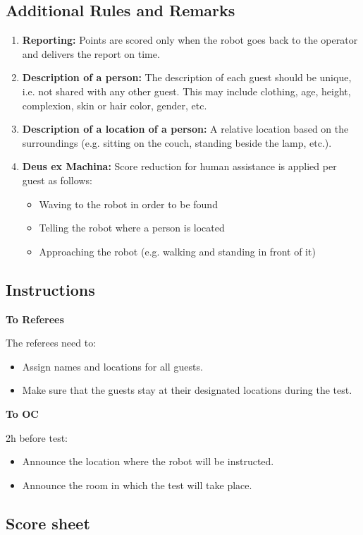 \subsection*{Additional Rules and Remarks}
\begin{enumerate}[nosep]
	\item \textbf{Reporting:} Points are scored only when the robot goes back to the operator and delivers the report on time.

    \item \textbf{Description of a person:} The description of each guest should be unique, i.e. not shared with any other guest. This may include clothing, age, height, complexion, skin or hair color, gender, etc.

	\item \textbf{Description of a location of a person:} A relative location based on the surroundings (e.g. sitting on the couch, standing beside the lamp, etc.).
	

	\item \textbf{Deus ex Machina:} Score reduction for human assistance is applied per guest as follows:

		\begin{itemize}
		    \item Waving to the robot in order to be found
			\item Telling the robot where a person is located
			\item Approaching the robot (e.g. walking and standing in front of it)
		\end{itemize}

\end{enumerate}

\subsection*{Instructions}

\textbf{To Referees}

The referees need to:
\begin{itemize}
	\item Assign names and locations for all guests.
	\item Make sure that the guests stay at their designated locations during the test.
\end{itemize}

\noindent \textbf{To OC}

2h before test:
\begin{itemize}
	\item Announce the location where the robot will be instructed.
	\item Announce the room in which the test will take place.
\end{itemize}

\subsection*{Score sheet}

